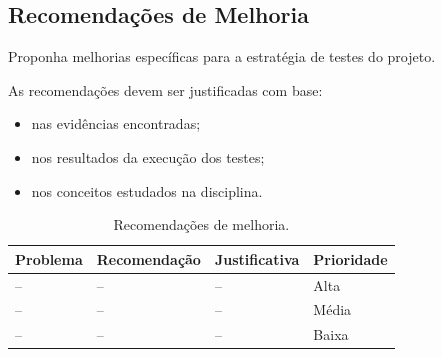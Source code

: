 
\subsection{Recomendações de Melhoria}

Proponha melhorias específicas para a estratégia de testes
do projeto.

As recomendações devem ser justificadas com base:

\begin{itemize}
    \item nas evidências encontradas;
    \item nos resultados da execução dos testes;
    \item nos conceitos estudados na disciplina.
\end{itemize}

\begin{table}[H]
\centering
\caption{Recomendações de melhoria.}
\label{tab:recomendacoes}
\begin{tabularx}{\textwidth}{l X X X}
\toprule
\textbf{Problema}
&
\textbf{Recomendação}
&
\textbf{Justificativa}
&
\textbf{Prioridade}
\\
\midrule
-- & -- & -- & Alta \\
-- & -- & -- & Média \\
-- & -- & -- & Baixa \\
\bottomrule
\end{tabularx}
\end{table}
